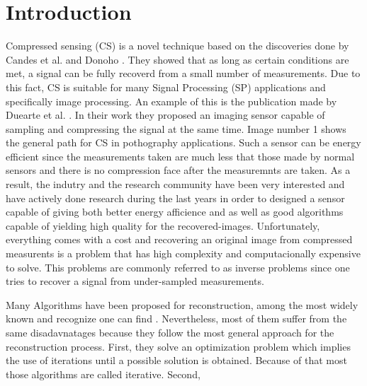 \chapter{Introduction}
Compressed sensing (CS) is a novel technique based on the discoveries done by Candes et al. \cite{CandesR07} and Donoho \cite{Donoho01}. They showed that as long as certain conditions are met, a signal can be fully recoverd from a small number of measurements. Due to this fact, CS is suitable for many Signal Processing (SP) applications and specifically image processing. An example of this is the publication made by Duearte et al. \cite{duarte2008single}. In their work they  proposed an imaging sensor capable of sampling and compressing the signal at the same time. Image number 1 shows the general path for CS in pothography applications. Such a sensor can be energy efficient since the measurements taken are much less that those made by normal sensors and there is no compression face after the measuremnts are taken. As a result, the indutry and the research community have been very interested and have actively done research during the last years in order to designed a sensor capable of giving both better energy afficience and as well as good algorithms capable of yielding high quality for the recovered-images. Unfortunately, everything comes with a cost and recovering an original image from compressed measurents is a problem that has high complexity and computacionally expensive to solve. This problems are commonly referred to as inverse problems since one tries to recover a signal from under-sampled measurements. \

Many Algorithms have been proposed for reconstruction, among the most widely known and recognize one can find \cite{metzler2014denoising,dong2014compressive, li2013efficient,mun2009block,chen2011compressed,fowler2011multiscale}. Nevertheless, most of them suffer from the same disadavnatages because they follow the most general approach for the reconstruction process. First, they solve an optimization problem which implies the use of iterations until a possible solution is obtained. Because of that most those algorithms are called iterative. Second,   


        


